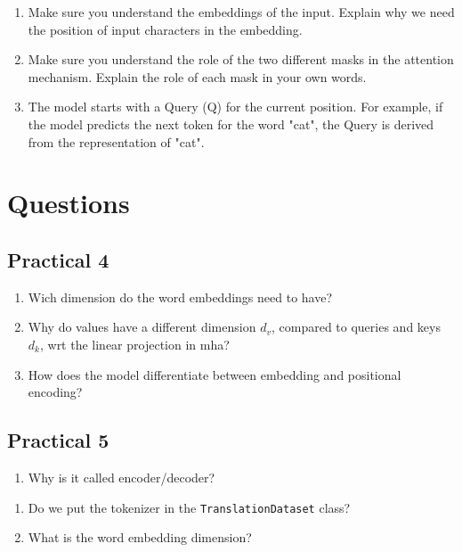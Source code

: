 \documentclass{article}
\begin{document}










\begin{enumerate}
	\item Make sure you understand the embeddings of the input. Explain why we need the position of input characters in the embedding.
	\item Make sure you understand the role of the two different masks in the attention mechanism. Explain the role of each mask in your own words.
	\item The model starts with a Query (Q) for the current position. For example, if the model predicts the next token for the word "cat", the Query is derived from the representation of "cat".
\end{enumerate}

\section{Questions}
\subsection{Practical 4}
\begin{enumerate}
	\item Wich dimension do the word embeddings need to have?
	\item Why do values have a different dimension \(d_v\), compared to queries and keys \(d_k \), wrt the linear projection in mha?
    \item How does the model differentiate between embedding and positional encoding?
\end{enumerate}
\subsection{Practical 5}
\begin{enumerate}
	\item Why is it called encoder/decoder?
\end{enumerate}
\begin{enumerate}
	\item Do we put the tokenizer in the \lstinline{TranslationDataset} class?
	\item What is the word embedding dimension?
\end{enumerate}


\clearpage



\clearpage



\clearpage

\end{document}
